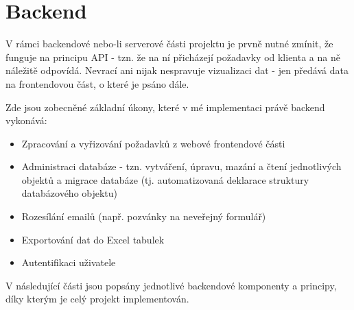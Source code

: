 \section{Backend}
	V rámci backendové nebo-li serverové části projektu je prvně nutné zmínit, že funguje na principu API - tzn. že na ní přicházejí požadavky od klienta a na ně náležitě odpovídá. Nevrací ani nijak nespravuje vizualizaci dat - jen předává data na frontendovou část, o které je psáno dále.
	
	Zde jsou zobecněné základní úkony, které v mé implementaci právě backend vykonává:
	
	\begin{itemize}
		\item Zpracování a vyřizování požadavků z webové frontendové části
		\item Administraci databáze - tzn. vytváření, úpravu, mazání a čtení jednotlivých objektů a migrace databáze (tj. automatizovaná deklarace struktury databázového objektu)
		\item Rozesílání emailů (např. pozvánky na neveřejný formulář)
		\item Exportování dat do Excel tabulek
		\item Autentifikaci uživatele
	\end{itemize}
	 
	V následující části jsou popsány jednotlivé backendové komponenty a principy, díky kterým je celý projekt implementován.
	
